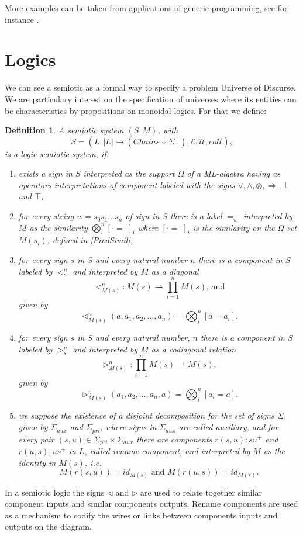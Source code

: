 \documentclass[oribibl]{llncs}
\newtheorem{defn}{Definition}
\newcommand{\E}{\mathcal{E}}
\newcommand{\U}{\mathcal{U}}
\begin{document}
More examples can be taken from applications of generic programming, see for instance \cite{Fiadeiro97}.

\section{Logics}\label{logics}

We can see a semiotic as a formal way to specify a problem Universe of Discurse. We are particulary interest on the specification of universes where its entities can be characteristics by propositions on monoidal logics. For that we define:
\begin{defn}
A semiotic system $(S,M)$, with
\[S=(L:|L|\rightarrow (Chains\downarrow \Sigma^+),\E,\U,co\U),\]
is a \emph{logic semiotic system}, if:
\begin{enumerate}
  \item exists a sign in $S$ interpreted as the support $\Omega$ of a ML-algebra having as operators interpretations of
component labeled with the signs $\vee ,\wedge ,\otimes,
\Rightarrow ,\bot$  and $\top$,
  \item for every string $w=s_0s_1\ldots s_n$ of sign in $S$ there is a label $=_w$ interpreted by $M$ as the similarity $\bigotimes_i^n[\cdot=\cdot]_i$ where $[\cdot=\cdot]_i$ is the similarity on the $\Omega$-set $M(s_i)$, defined in \ref{ProdSimil},
  \item for every sign $s$ in $S$ and every natural number $n$ there is a
  component in $S$ labeled by $\lhd^n_s$ and interpreted by $M$ as a
  diagonal \[\lhd^n_{M(s)}:M(s)\rightharpoonup
  \prod^n_{i=1}M(s)\text{, and}\]
  given by \[\lhd^n_{M(s)}(a,a_1,a_2,\ldots,a_n)=\bigotimes_i^n[a=a_i].\]
  \item for every sign $s$ in $S$ and every natural number, $n$ there is a
  component in $S$ labeled by $\rhd^n_s$ and interpreted by $M$ as a
  codiagonal relation \[\rhd^n_{M(s)}:\prod^n_{i=1}M(s)\rightharpoonup
  M(s),\] given by \[\rhd^n_{M(s)}(a_1,a_2,\ldots,a_n,a)=\bigotimes_i^n[a_i=a].\]
  \item we suppose the existence of a disjoint decomposition for the set of signs $\Sigma$, given by $\Sigma_{aux}$
  and $\Sigma_{pri}$, where signs in $\Sigma_{aux}$ are called \emph{auxiliary}, and
  for every pair $(s,u)\in \Sigma_{pri}\times \Sigma_{aux}$ there are
  components $r(s,u):su^+$ and $r(u,s):us^+$ in $L$, called \emph{rename component}, and interpreted by $M$ as the
  identity in $M(s)$, i.e. \[M(r(s,u))=id_{M(s)} \text{ and } M(r(u,s))=id_{M(s)}.\]
\end{enumerate}
\end{defn}
In a semiotic logic the signs $\triangleleft$ and $\triangleright$ are used to relate together similar component inputs and similar components outputs. Rename components are used as a mechanism to codify the wires or links between components inputs and outputs on the diagram.
\end{document}
